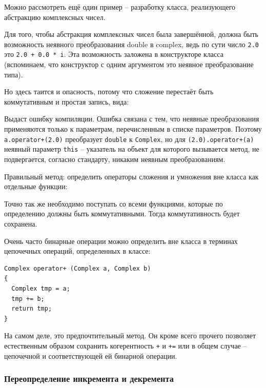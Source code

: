 \documentclass[a4paper,12pt,oneside]{article}
\begin{document}
Можно рассмотреть ещё один пример -- разработку класса, реализующего абстракцию комплексных чисел.

Для того, чтобы абстракция комплексных чисел была завершённой, должна быть возможность неявного преобразования double в complex, ведь по сути число \lstinline!2.0! это \lstinline!2.0 + 0.0 * i!. Эта возможность заложена в конструкторе класса (вспоминаем, что конструктор с одним аргументом это неявное преобразование типа).



Но здесь таится и опасность, потому что сложение перестаёт быть коммутативным и простая запись, вида:



Выдаст ошибку компиляции. Ошибка связана с тем, что неявные преобразования применяются только к параметрам, перечисленным в списке параметров. Поэтому \lstinline!a.operator+(2.0)! преобразует \lstinline!double! к \lstinline!Complex!, но для \lstinline!(2.0).operator+(a)! неявный параметр \lstinline!this! -- указатель на объект для которого вызывается метод, не подвергается, согласно стандарту, никаким неявным преобразованиям.

Правильный метод: определить операторы сложения и умножения вне класса как отдельные функции:



Точно так же необходимо поступать со всеми функциями, которые по определению должны быть коммутативными. Тогда коммутативность будет сохранена.

Очень часто бинарные операции можно определить вне класса в терминах цепочечных операций, определенных в классе:

\begin{lstlisting}
Complex operator+ (Complex a, Complex b)
{
  Complex tmp = a;
  tmp += b;
  return tmp;
}
\end{lstlisting}

На самом деле, это предпочтительный метод. Он кроме всего прочего позволяет естественным образом сохранить когерентность \lstinline!+! и \lstinline!+=! или в общем случае -- цепочечной и соответствующей ей бинарной операции.

\subsubsection{Переопределение инкремента и декремента}\label{IncrOverload}
\end{document}
